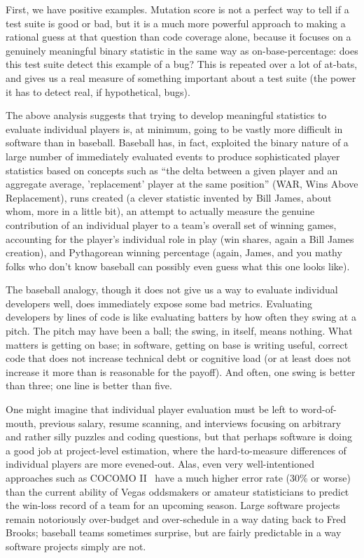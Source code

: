 \documentclass[sigplan,screen]{acmart}
\begin{document}
First, we have positive examples.  Mutation score is not a perfect way
to tell if a test suite is good or bad, but it is a much more powerful
approach to making a rational guess at that question than code
coverage alone, because it focuses on a genuinely meaningful binary
statistic in the same way as on-base-percentage:  does this test suite
detect this example of a bug?  This is repeated over a lot of at-bats,
and gives us a real measure of something important about a test suite
(the power it has to detect real, if hypothetical, bugs).

The above analysis suggests that trying to develop meaningful
statistics to evaluate individual players is, at minimum, going to be
vastly more difficult in software than in baseball.  Baseball has, in
fact, exploited the binary nature of a large number of immediately
evaluated events to produce sophisticated player statistics based on
concepts such as ``the delta between a given player and an aggregate
average, 'replacement' player at the same position'' (WAR, Wins Above
Replacement), runs created (a clever statistic invented by Bill James, about whom, more in
a little bit), an attempt to actually measure the genuine contribution
of an individual player to a team's overall set of winning games,
accounting for the player's individual role in play (win
shares, again a Bill James creation), and Pythagorean winning
percentage (again, James, and you mathy folks who don't know baseball can possibly even guess
what this one looks like).

The baseball analogy, though it does not give us a way to evaluate
individual developers well, does immediately expose some bad
metrics. Evaluating developers by lines of code is like evaluating
batters by how often they swing at a pitch. The pitch may have been a
ball; the swing, in itself, means nothing. What matters is getting on
base; in software, getting on base is writing useful, correct code that does not increase
technical debt or cognitive load (or at least does not increase it more than
is reasonable for the payoff). And often, one swing is better than
three; one line is better than five.

One might imagine that individual player evaluation must be left to
word-of-mouth, previous salary, resume scanning, and interviews
focusing on arbitrary and rather silly puzzles and coding questions,
but that perhaps software is doing a good job at project-level
estimation, where the hard-to-measure differences of individual
players are more evened-out.  Alas, even very well-intentioned
approaches such as COCOMO II~\cite{boehm2000cocomo} have a much higher error rate (30\% or
worse) than the current ability of Vegas oddsmakers or amateur
statisticians to predict the win-loss record of a team for an upcoming
season.  Large software projects remain notoriously over-budget and
over-schedule in a way dating back to Fred Brooks; baseball teams
sometimes surprise, but are fairly predictable in a way software
projects simply are not.
\end{document}
